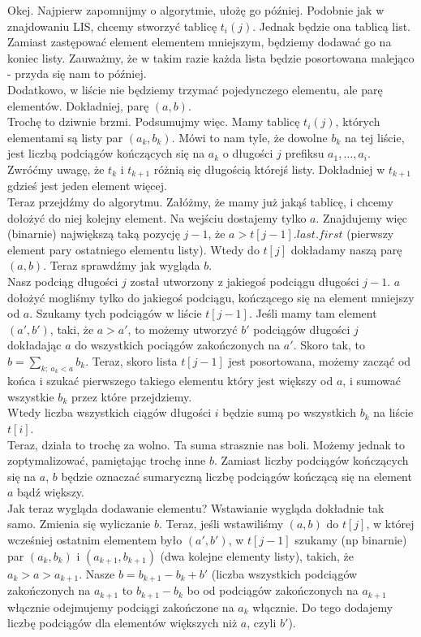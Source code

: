 \documentclass[a4paper]{article}
\begin{document}
Okej. Najpierw zapomnijmy o algorytmie, ułożę go później. Podobnie jak w znajdowaniu LIS, chcemy stworzyć tablicę $t_i(j)$. Jednak będzie ona tablicą list. Zamiast zastępować element elementem mniejszym, będziemy dodawać go na koniec listy. Zauważmy, że w takim razie każda lista będzie posortowana malejąco - przyda się nam to później.\\
Dodatkowo, w liście nie będziemy trzymać pojedynczego elementu, ale parę elementów. Dokładniej, parę $(a,b)$.\\
Trochę to dziwnie brzmi. Podsumujmy więc. Mamy tablicę $t_i(j)$, których elementami są listy par $(a_k,b_k)$. Mówi to nam tyle, że dowolne $b_k$ na tej liście, jest liczbą podciągów kończących się na $a_k$ o długości $j$ prefiksu $a_1, \dots , a_i$.\\
Zwróćmy uwagę, że $t_k$ i $t_{k+1}$ różnią się długością którejś listy. Dokładniej w $t_{k+1}$ gdzieś jest jeden element więcej.\\
Teraz przejdźmy do algorytmu. Załóżmy, że mamy już jakąś tablicę, i chcemy dołożyć do niej kolejny element. Na wejściu dostajemy tylko $a$. Znajdujemy więc (binarnie) największą taką pozycję $j-1$, że $a>t[j-1].last.first$ (pierwszy element pary ostatniego elementu listy). Wtedy do $t[j]$ dokładamy naszą parę $(a,b)$. Teraz sprawdźmy jak wygląda $b$.\\
Nasz podciąg długości $j$ został utworzony z jakiegoś podciągu długości $j-1$. $a$ dołożyć mogliśmy tylko do jakiegoś podciągu, kończącego się na element mniejszy od $a$. Szukamy tych podciągów w liście $t[j-1]$. Jeśli mamy tam element $(a',b')$, taki, że $a>a'$, to możemy utworzyć $b'$ podciągów długości $j$ dokładając $a$ do wszystkich pociągów zakończonych na $a'$. Skoro tak, to $b=\sum\limits_{k:\ a_k<a} b_k$. Teraz, skoro lista $t[j-1]$ jest posortowana, możemy zacząć od końca i szukać pierwszego takiego elementu który jest większy od $a$, i sumować wszystkie $b_k$ przez które przejdziemy.\\
Wtedy liczba wszystkich ciągów długości $i$ będzie sumą po wszystkich $b_k$ na liście $t[i]$.\\
Teraz, działa to trochę za wolno. Ta suma strasznie nas boli. Możemy jednak to zoptymalizować, pamiętając trochę inne $b$. Zamiast liczby podciągów kończących się na $a$, $b$ będzie oznaczać sumaryczną liczbę podciągów kończącą się na element $a$ bądź większy.\\
Jak teraz wygląda dodawanie elementu? Wstawianie wygląda dokładnie tak samo. Zmienia się wyliczanie $b$. Teraz, jeśli wstawiliśmy $(a,b)$ do $t[j]$, w której wcześniej ostatnim elementem było $(a',b')$, w $t[j-1]$ szukamy (np binarnie) par $(a_k,b_k)$ i $(a_{k+1},b_{k+1})$ (dwa kolejne elementy listy), takich, że $a_k>a>a_{k+1}$. Nasze $b=b_{k+1}-b_k+b'$ (liczba wszystkich podciągów zakończonych na $a_{k+1}$ to $b_{k+1}-b_k$ bo od podciągów zakończonych na $a_{k+1}$ włącznie odejmujemy podciągi zakończone na $a_k$ włącznie. Do tego dodajemy liczbę podciągów dla elementów większych niż $a$, czyli $b'$).\\
\end{document}
